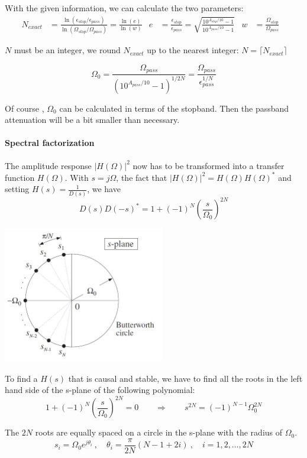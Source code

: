 With the given information, we can calculate the two parameters:
\begin{align*}
	N_{exact} &= \frac{
			\ln(\epsilon_{stop} / \epsilon_{pass})
		}{
			\ln(\Omega_{stop} / \Omega_{pass})
		}
	= \frac{\ln(e)}{\ln(w)} &	
	e &= \frac{\epsilon_{stop}}{\epsilon_{pass}}
	   = \sqrt{\frac{10^{A_{stop}/10} -1}{10^{A_{pass}/10} -1}}&
	w &= \frac{\Omega_{stop}}{\Omega_{pass}}&	
\end{align*}

$N$ must be an integer, we round $N_{exact}$ up to the nearest integer: $N = \lceil N_{exact} \rceil$

\[
	\Omega_0 = \frac{
			\Omega_{pass}
		}{
			\left(10^{A_{pass}/10}-1\right)^{1/2N}
		} = \frac{
			\Omega_{pass}
		}{
			\epsilon_{pass}^{1/N}
		}
\]

Of course , $\Omega_0$ can be calculated in terms of the stopband. Then the
passband attenuation will be a bit smaller than necessary. 

\paragraph{Spectral factorization}
The amplitude response $\left|H(\Omega)\right|^2$ now has to be transformed
into a transfer function $H(\Omega)$. With $s = j \Omega$, the fact that
$\left|H(\Omega)\right|^2 = H(\Omega) H(\Omega)^*$ and setting 
$H(s) = \frac{1}{D(s)}$, we have
\begin{equation*}
	D(s) D(-s)^* = 1 + (-1)^N \left( \frac{s}{\Omega_0} \right)^{2N}
\end{equation*}

\vspace{1em}

\begin{multicols}{2}
	\includegraphics[width=7cm]{images/IIR_ButterworthCircle.jpg}
\vfill
\columnbreak

	To find a $H(s)$ that is causal and stable, we have to find all the roots
	in the left hand side of the s-plane of the following polynomial:
	\begin{equation*}
		1 + (-1)^N \left(\frac{s}{\Omega_0}\right)^{2N} = 0 \qquad \Rightarrow \qquad s^{2N} = (-1)^{N-1} \Omega_0^{2N}
	\end{equation*}
	
	The $2N$ roots are equally spaced on a circle in the s-plane with the radius
	of $\Omega_0$. 
	\begin{equation*}
		s_i = \Omega_0 e^{j \theta_i} \:, \quad \theta_i = \frac{\pi}{2N} (N - 1 + 2i) \:, \quad  i = 1,2,\ldots,2N
	\end{equation*}
\end{multicols}

